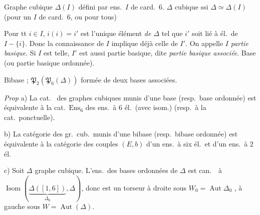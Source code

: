 \documentclass[11pt,a4paper]{article}
\begin{document}
Graphe cubique $\Delta(I)$ défini par ens.\ $I$ de card.\ $6$. $\Delta$
cubique ssi $\Delta \simeq \Delta(I)$ (pour un $I$ de card.\ $6$, ou pour
tous)

Pour tt $i \in I$, $i(i) = i'$ est l'unique élément \emph{de $\Delta$} tel
que $i'$ soit lié à  \add{\ill{}} él.\ de $I - \{i\}$.
Donc la connaissance de $I$ implique déjà celle de $I'$. On appelle $I$
\emph{partie basique}. Si $I$ est telle, $I'$ est aussi partie basique, dite
\emph{partie basique associée}. Base (ou partie basique ordonnée).


Bibase ;  
$\mathfrak{P}_2(\mathfrak{P}_6(\Delta))$ formée de deux \struck{\ill{}}
bases associées.

\emph{Prop} a) La cat.\  des graphes
cubiques munis d'une base (resp.\ base ordonnée) est 
équivalente à la cat.\ $\mathrm{Ens}_6$ des ens.\ à $6$ él.\ (avec isom.)
(resp.\ à la cat.\ ponctuelle).

b) La catégorie des gr.\ cub.\ munis d'une bibase (resp.\ bibase ordonnée)
est  équivalente à la catégorie
 des couples $(E, b)$ d'un
ens.\ à six él.\ et d'un ens.\ à $2$ él.

c) Soit $\Delta$ graphe cubique. L'ens.\ des bases ordonnées de $\Delta$ est
can.\ \ à $\operatorname{Isom}(\underset{\Delta_0}{\underbrace{\Delta([1,6])}}, \Delta)$, donc est un torseur à
droite sous $W_0 = \operatorname{Aut} \Delta_0$ \struck{$([1,6])$}, à gauche
sous $W = \operatorname{Aut}(\Delta)$.
\end{document}
